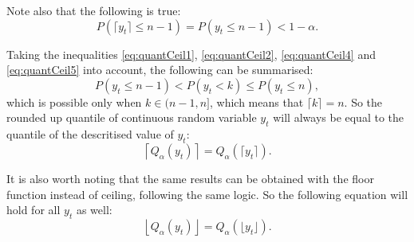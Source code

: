 \documentclass[]{elsarticle} %
\begin{document}
Note also that the following is true:
\begin{equation} \label{eq:quantCeil5}
    P \left(\lceil y_t \rceil \leq n-1 \right) = P \left(y_t \leq n-1 \right) < 1 - \alpha .
\end{equation}

Taking the inequalities \eqref{eq:quantCeil1}, \eqref{eq:quantCeil2},
\eqref{eq:quantCeil4} and \eqref{eq:quantCeil5} into account, the
following can be summarised: \begin{equation} \label{eq:quantCeil6}
    P \left(y_t \leq n-1 \right) < P \left(y_t < k \right) \leq P \left(y_t \leq n \right) ,
\end{equation} which is possible only when \(k \in (n-1, n]\), which means
that \(\lceil k \rceil = n\). So the rounded up quantile of continuous
random variable \(y_t\) will always be equal to the quantile of the
descritised value of \(y_t\):
\begin{equation} \label{eq:ceilingAndQuantiles1}
    \left \lceil Q_\alpha(y_t) \right \rceil = Q_\alpha \left(\lceil y_t \rceil \right) .
\end{equation}

It is also worth noting that the same results can be obtained with the
floor function instead of ceiling, following the same logic. So the
following equation will hold for all \(y_t\) as well:
\begin{equation} \label{eq:floorAndQuantiles1}
    \left \lfloor Q_\alpha(y_t) \right \rfloor = Q_\alpha \left(\lfloor y_t \rfloor \right) .
\end{equation}

\renewcommand\refname{References}

\end{document}
